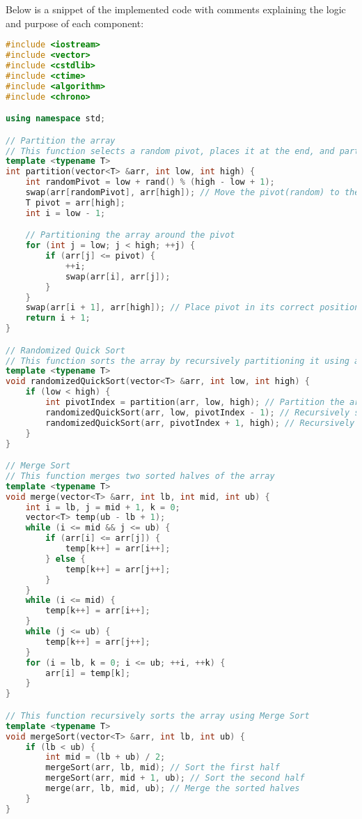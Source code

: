 \documentclass{article}
\begin{document}
Below is a snippet of the implemented code with comments explaining the logic and purpose of each component:

\begin{lstlisting}[language=C++]
#include <iostream>
#include <vector>
#include <cstdlib>
#include <ctime>
#include <algorithm>
#include <chrono>

using namespace std;

// Partition the array
// This function selects a random pivot, places it at the end, and partitions the array around the pivot
template <typename T>
int partition(vector<T> &arr, int low, int high) {
    int randomPivot = low + rand() % (high - low + 1);
    swap(arr[randomPivot], arr[high]); // Move the pivot(random) to the end
    T pivot = arr[high];
    int i = low - 1;

    // Partitioning the array around the pivot
    for (int j = low; j < high; ++j) {
        if (arr[j] <= pivot) {
            ++i;
            swap(arr[i], arr[j]);
        }
    }
    swap(arr[i + 1], arr[high]); // Place pivot in its correct position
    return i + 1;
}

// Randomized Quick Sort
// This function sorts the array by recursively partitioning it using a random pivot
template <typename T>
void randomizedQuickSort(vector<T> &arr, int low, int high) {
    if (low < high) {
        int pivotIndex = partition(arr, low, high); // Partition the array and get pivot index
        randomizedQuickSort(arr, low, pivotIndex - 1); // Recursively sort elements before pivot
        randomizedQuickSort(arr, pivotIndex + 1, high); // Recursively sort elements after pivot
    }
}

// Merge Sort
// This function merges two sorted halves of the array
template <typename T>
void merge(vector<T> &arr, int lb, int mid, int ub) {
    int i = lb, j = mid + 1, k = 0;
    vector<T> temp(ub - lb + 1);
    while (i <= mid && j <= ub) {
        if (arr[i] <= arr[j]) {
            temp[k++] = arr[i++];
        } else {
            temp[k++] = arr[j++];
        }
    }
    while (i <= mid) {
        temp[k++] = arr[i++];
    }
    while (j <= ub) {
        temp[k++] = arr[j++];
    }
    for (i = lb, k = 0; i <= ub; ++i, ++k) {
        arr[i] = temp[k];
    }
}

// This function recursively sorts the array using Merge Sort
template <typename T>
void mergeSort(vector<T> &arr, int lb, int ub) {
    if (lb < ub) {
        int mid = (lb + ub) / 2;
        mergeSort(arr, lb, mid); // Sort the first half
        mergeSort(arr, mid + 1, ub); // Sort the second half
        merge(arr, lb, mid, ub); // Merge the sorted halves
    }
}


\end{lstlisting}
\end{document}
